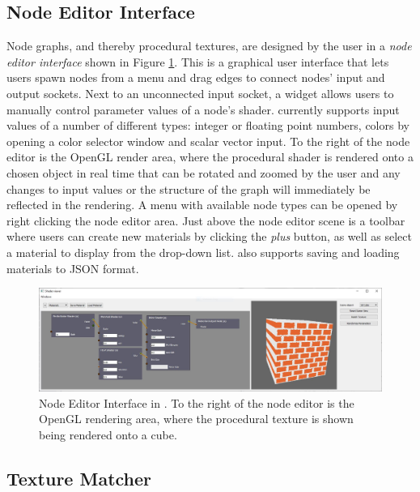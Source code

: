 \subsection{Node Editor Interface}\label{sec:NodeEditorInterface}

Node graphs, and thereby procedural textures, are designed by the user in a \textit{node editor interface} shown in Figure \ref{fig:NodeEditorInterface}. This is a graphical user interface that lets users spawn nodes from a menu and drag edges to connect nodes' input and output sockets. Next to an unconnected input socket, a widget allows users to manually control parameter values of a node's shader. \dipter{} currently supports input values of a number of different types: integer or floating point numbers, colors by opening a color selector window and scalar vector input. To the right of the node editor is the OpenGL render area, where the procedural shader is rendered onto a chosen object in real time that can be rotated and zoomed by the user and any changes to input values or the structure of the graph will immediately be reflected in the rendering. A menu with available node types can be opened by right clicking the node editor area. Just above the node editor scene is a toolbar where users can create new materials by clicking the \emph{plus} button, as well as select a material to display from the drop-down list. \dipter{} also supports saving and loading materials to JSON format.
 
 
\begin{figure}[!h]
    \centering
    \includegraphics[width=.9\textwidth]{img/method/Node Editor.JPG}
    \caption{Node Editor Interface in \dipter{}. To the right of the node editor is the OpenGL rendering area, where the procedural texture is shown being rendered onto a cube.}
    \label{fig:NodeEditorInterface}
\end{figure}

\subsection{Texture Matcher}\label{sec:TextureMatcherInterface}

